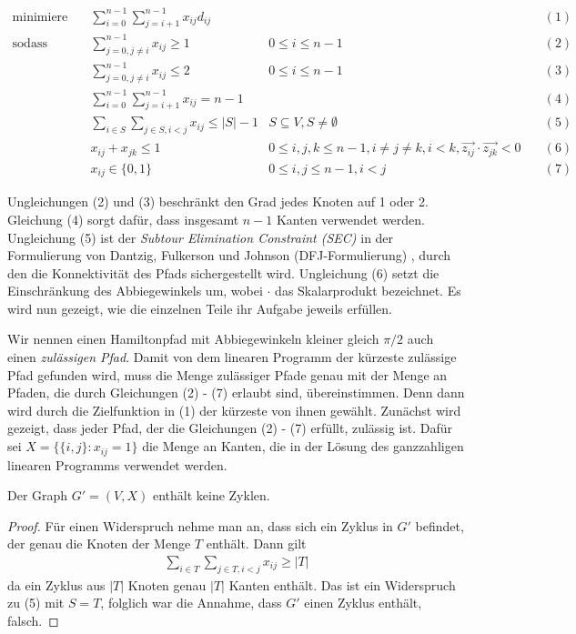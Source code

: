 \documentclass[a4paper, 10pt, ngerman]{article}
\begin{document}
\begin{align*}
    \text{minimiere} \quad & \sum_{i = 0}^{n - 1} \sum_{j = i + 1}^{n - 1} x_{ij} d_{ij} & & \quad (1) \\
    \text{sodass} \quad 
    & \sum_{j = 0, j \ne i}^{n - 1} x_{ij} \ge 1 & 0 \le i \le n - 1 & \quad (2) \\
    & \sum_{j = 0, j \ne i}^{n - 1} x_{ij} \le 2 & 0 \le i \le n - 1 & \quad (3) \\
    & \sum_{i = 0}^{n - 1} \sum_{j = i + 1}^{n - 1} x_{ij} = n - 1 & & \quad (4) \\
    & \sum_{i \in S} \sum_{j \in S, i < j} x_{ij} \le |S| - 1 & S \subseteq V, S \ne \emptyset & \quad (5) \\
    & x_{ij} + x_{jk} \le 1 & 0 \le i, j, k \le n - 1, i \ne j \ne k, i < k, \vec{z_{ij}} \cdot \vec{z_{jk}} < 0 & \quad (6) \\
    & x_{ij} \in \{0, 1\} & 0 \le i, j \le n - 1, i < j & \quad (7)
\end{align*}
\smallskip

Ungleichungen (2) und (3) beschränkt den Grad jedes Knoten auf 1 oder 2. Gleichung (4) sorgt dafür, dass insgesamt $n - 1$ Kanten verwendet werden. Ungleichung (5) ist der \emph{Subtour Elimination Constraint (SEC)} in der Formulierung von Dantzig, Fulkerson und Johnson (DFJ-Formulierung) \cite{tsp-formulations}, durch den die Konnektivität des Pfads sichergestellt wird. Ungleichung (6) setzt die Einschränkung des Abbiegewinkels um, wobei $\cdot$ das Skalarprodukt bezeichnet. Es wird nun gezeigt, wie die einzelnen Teile ihr Aufgabe jeweils erfüllen. 

Wir nennen einen Hamiltonpfad mit Abbiegewinkeln kleiner gleich $\pi / 2$ auch einen \emph{zulässigen Pfad}. Damit von dem linearen Programm der kürzeste zulässige Pfad gefunden wird, muss die Menge zulässiger Pfade genau mit der Menge an Pfaden, die durch Gleichungen (2) - (7) erlaubt sind, übereinstimmen. Denn dann wird durch die Zielfunktion in (1) der kürzeste von ihnen gewählt. Zunächst wird gezeigt, dass jeder Pfad, der die Gleichungen (2) - (7) erfüllt, zulässig ist. Dafür sei $X = \{\{i, j\} : x_{ij} = 1\}$ die Menge an Kanten, die in der Lösung des ganzzahligen linearen Programms verwendet werden.

\begin{lemma}
    Der Graph $G' = (V, X)$ enthält keine Zyklen.
\end{lemma}

\begin{proof}
    Für einen Widerspruch nehme man an, dass sich ein Zyklus in $G'$ befindet, der genau die Knoten der Menge $T$ enthält. Dann gilt
    \begin{align*}
        \sum_{i \in T} \sum_{j \in T, i < j} x_{ij} \ge |T|
    \end{align*}
    da ein Zyklus aus $|T|$ Knoten genau $|T|$ Kanten enthält. Das ist ein Widerspruch zu (5) mit $S = T$, folglich war die Annahme, dass $G'$ einen Zyklus enthält, falsch.
\end{proof}
\end{document}
